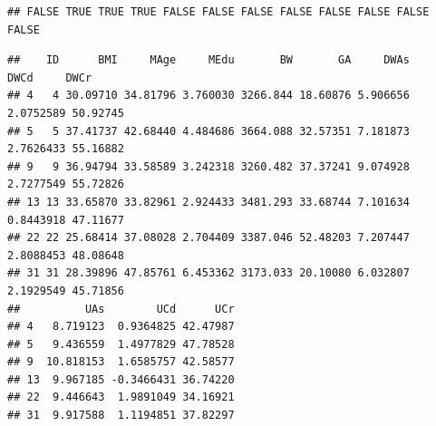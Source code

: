 \documentclass[
]{book}
\newenvironment{Shaded}{\begin{snugshade}}{\end{snugshade}}
\newcommand{\CommentTok}[1]{\textcolor[rgb]{0.56,0.35,0.01}{\textit{#1}}}
\newcommand{\DecValTok}[1]{\textcolor[rgb]{0.00,0.00,0.81}{#1}}
\newcommand{\KeywordTok}[1]{\textcolor[rgb]{0.13,0.29,0.53}{\textbf{#1}}}
\newcommand{\NormalTok}[1]{#1}
\newcommand{\OperatorTok}[1]{\textcolor[rgb]{0.81,0.36,0.00}{\textbf{#1}}}
\newcommand{\StringTok}[1]{\textcolor[rgb]{0.31,0.60,0.02}{#1}}
\begin{document}
\begin{verbatim}
## FALSE TRUE TRUE TRUE FALSE FALSE FALSE FALSE FALSE FALSE FALSE FALSE
\end{verbatim}

\begin{Shaded}
\end{Shaded}

\begin{verbatim}
##    ID      BMI     MAge     MEdu       BW       GA     DWAs      DWCd     DWCr
## 4   4 30.09710 34.81796 3.760030 3266.844 18.60876 5.906656 2.0752589 50.92745
## 5   5 37.41737 42.68440 4.484686 3664.088 32.57351 7.181873 2.7626433 55.16882
## 9   9 36.94794 33.58589 3.242318 3260.482 37.37241 9.074928 2.7277549 55.72826
## 13 13 33.65870 33.82961 2.924433 3481.293 33.68744 7.101634 0.8443918 47.11677
## 22 22 25.68414 37.08028 2.704409 3387.046 52.48203 7.207447 2.8088453 48.08648
## 31 31 28.39896 47.85761 6.453362 3173.033 20.10080 6.032807 2.1929549 45.71856
##          UAs        UCd      UCr
## 4   8.719123  0.9364825 42.47987
## 5   9.436559  1.4977829 47.78528
## 9  10.818153  1.6585757 42.58577
## 13  9.967185 -0.3466431 36.74220
## 22  9.446643  1.9891049 34.16921
## 31  9.917588  1.1194851 37.82297
\end{verbatim}
\end{document}
